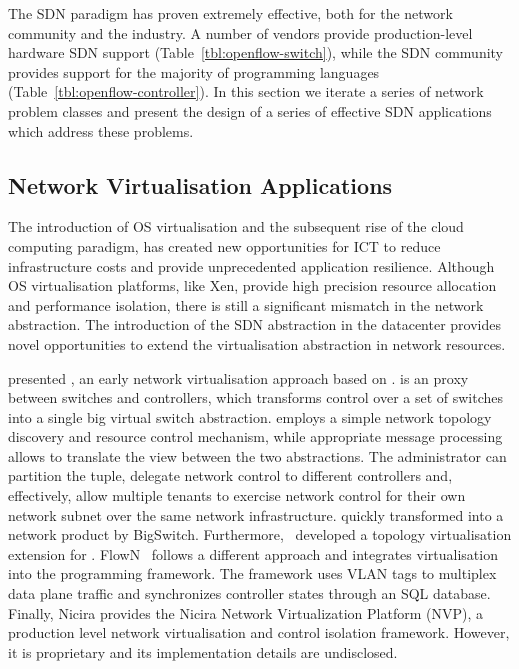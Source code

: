 The SDN paradigm has proven extremely effective, both for the network community
and the industry. A number of vendors provide production-level hardware SDN
support (Table~\ref{tbl:openflow-switch}), while the SDN community provides \of
support for the majority of programming languages
(Table~\ref{tbl:openflow-controller}).  In this section we iterate a series of
network problem classes and present the design of a series of effective SDN
applications which address these problems.

\subsection{Network Virtualisation Applications}

The introduction of OS virtualisation and the subsequent rise of the cloud
computing paradigm, has created new opportunities for ICT to reduce
infrastructure costs and provide unprecedented application resilience.
Although OS virtualisation platforms, like Xen, provide high precision resource
allocation and performance isolation, there is still a significant mismatch in
the network abstraction.  The introduction of the SDN abstraction in the
datacenter provides novel opportunities to extend the virtualisation abstraction
in network resources. 

 presented \flv, an early network virtualisation approach
based on \of.  \flv is an \of proxy between switches and controllers,
which transforms control over a set of switches into a single big
virtual switch abstraction.  \flv employs a simple network topology discovery
and resource control mechanism, while appropriate message processing allows to
translate the view between the two abstractions.  The administrator can
partition the \of tuple, delegate network control to different controllers and,
effectively, allow multiple tenants to exercise network control for their own
network subnet over the same network infrastructure.  \flv quickly
transformed into a network product by BigSwitch. Furthermore,
~developed a topology virtualisation extension for \flv.
FlowN~ follows a different approach and integrates
virtualisation into the  programming framework.  The framework uses VLAN tags to
multiplex data plane traffic and synchronizes controller states through an SQL
database. Finally, Nicira provides the Nicira Network Virtualization Platform
(NVP), a production level network virtualisation and control isolation
framework. However, it is proprietary and its implementation details are
undisclosed. 

